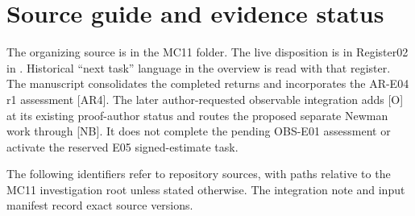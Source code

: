 \documentclass[11pt,letterpaper]{article}
\numberwithin{equation}{section}
\theoremstyle{remark}
\newcommand{\evid}[1]{\textsf{[#1]}}
\begin{document}
\section{Source guide and evidence status}
\label{sec:provenance}

The organizing source is
in the MC11 folder. The live disposition is in Register02 in
. Historical ``next task'' language in
the overview is read with that register. The manuscript consolidates
the completed returns and incorporates the AR-E04 r1 assessment
\evid{AR4}. The later author-requested observable integration adds
\evid{O} at its existing proof-author status and routes the proposed
separate Newman work through \evid{NB}. It does not complete the pending
OBS-E01 assessment or activate the reserved E05 signed-estimate task.

The following identifiers refer to repository sources, with paths
relative to the MC11 investigation root unless stated otherwise.
The integration note and input manifest record exact source versions.
\end{document}
